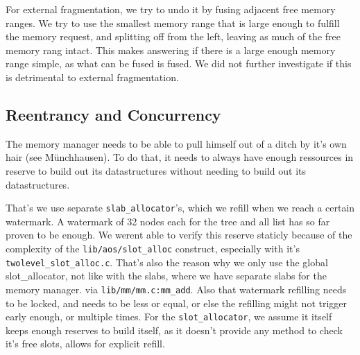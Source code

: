 For external fragmentation, we try to undo it by fusing adjacent free memory
ranges.
We try to use the smallest memory range that is large enough to fulfill the
memory request, and splitting off from the left, leaving as much of the free
memory rang intact.
This makes answering if there is a large enough memory range simple, as what
can be fused is fused.
We did not further investigate if this is detrimental to external fragmentation.

% 
% 
% 

\subsection{Reentrancy and Concurrency}\label{mem-con}

The memory manager needs to be able to pull himself out of a ditch by it's own
hair (see Münchhausen).
To do that, it needs to always have enough ressources in reserve to build out
its datastructures without needing to build out its datastructures.

That's we use separate \verb|slab_allocator|'s, which we refill when we reach a
certain watermark.
A watermark of 32 nodes each for the tree and all list has so far proven to be
enough.
We werent able to verify this reserve staticly because of the complexity of the
\verb|lib/aos/slot_alloc| construct, especially with it's
\verb|twolevel_slot_alloc.c|.
That's also the reason why we only use the global slot\_allocator, not like with
the slabs, where we have separate slabs for the memory manager.
via \verb|lib/mm/mm.c:mm_add|.
Also that watermark refilling needs to be locked, and needs to be less or equal,
or else the refilling might not trigger early enough, or multiple times.
For the \verb|slot_allocator|, we assume it itself keeps enough reserves to build
itself, as it doesn't provide any method to check it's free slots, allows for
explicit refill.

